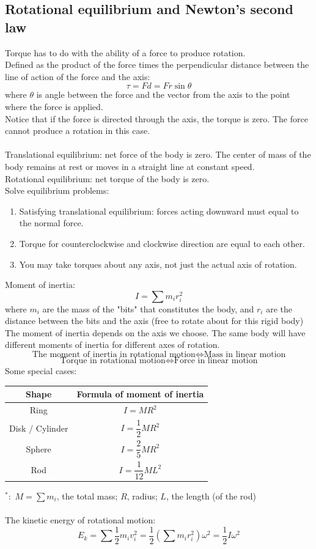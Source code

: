 \documentclass[a4paper,12pt]{article}
\begin{document}
\subsection{Rotational equilibrium and Newton's second law}
Torque has to do with the ability of a force to produce rotation.\\
Defined as the product of the force times the perpendicular distance between the line of action of the force and the axis:
\[\tau =Fd=Fr\sin\theta\]
where $\theta$ is angle between the force and the vector from the axis to the point where the force is applied.\\
Notice that if the force is directed through the axis, the torque is zero. The force cannot produce a rotation in this case.\\\\
Translational equilibrium: net force of the body is zero. The center of mass of the body remains at rest or moves in a straight line at constant speed.\\
Rotational equilibrium: net torque of the body is zero.\\
Solve equilibrium problems:
\begin{enumerate}
  \item Satisfying translational equilibrium: forces acting downward must equal to the normal force.
  \item Torque for counterclockwise and clockwise direction are equal to each other. 
  \item You may take torques about any axis, not just the actual axis of rotation.
\end{enumerate}
Moment of inertia:
\[I=\sum m_ir_i^2\]
where $m_i$ are the mass of the "bits" that constitutes the body, and $r_i$ are the distance between the bits and the axis (free to rotate about for this rigid body)\\
The moment of inertia depends on the axis we choose. The same body will have different moments of inertia for different axes of rotation.
\[\text{The moment of inertia in rotational motion}\Leftrightarrow\text{Mass in linear motion}\]
\[\text{Torque in rotational motion}\Leftrightarrow\text{Force in linear motion}\]
Some special cases:
\begin{center}
  \begin{tabular}{|c|c|}\hline
    Shape & Formula of moment of inertia \\\hline
    Ring & $I=MR^2$ \\\hline
    Disk / Cylinder & $I=\dfrac{1}{2}MR^2$ \\\hline
    Sphere & $I=\dfrac{2}{5}MR^2$ \\\hline
    Rod & $I=\dfrac{1}{12}ML^2$ \\\hline 
  \end{tabular}
\end{center}
$^*:$ $M=\displaystyle \sum m_i$, the total mass; $R$, radius; $L$, the length (of the rod)\\\\
The kinetic energy of rotational motion:
\[E_k=\sum \dfrac{1}{2}m_iv_i^2=\dfrac{1}{2}\left(\sum m_ir_i^2\right)\omega^2=\dfrac{1}{2}I\omega^2\]
\end{document}
